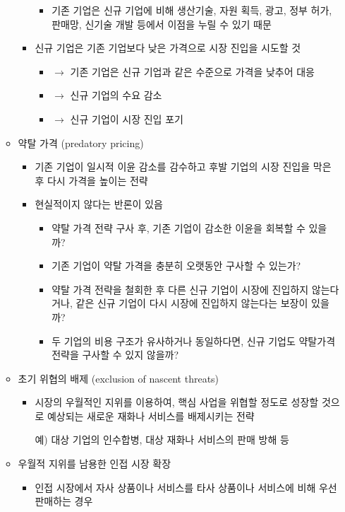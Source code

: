 \begin{itemize}
\begin{itemize}
\begin{itemize}
			\begin{itemize}
			\item 기존 기업은 신규 기업에 비해 생산기술, 자원 획득, 광고, 정부 허가, 판매망, 신기술 개발 등에서 이점을 누릴 수 있기 때문
			\end{itemize}
		\item 신규 기업은 기존 기업보다 낮은 가격으로 시장 진입을 시도할 것
			\begin{itemize}
			\item  $\rightarrow$ 기존 기업은 신규 기업과 같은 수준으로 가격을 낮추어 대응
			\item $\rightarrow$ 신규 기업의 수요 감소 
			\item $\rightarrow$ 신규 기업이 시장 진입 포기
			\end{itemize}
		\end{itemize}
	\item 약탈 가격 (predatory pricing)
		\begin{itemize}
		\item 기존 기업이 일시적 이윤 감소를 감수하고 후발 기업의 시장 진입을 막은 후 다시 가격을 높이는 전략
		\item 현실적이지 않다는 반론이 있음
			\begin{itemize}
			\item 약탈 가격 전략 구사 후, 기존 기업이 감소한 이윤을 회복할 수 있을까?
			\item 기존 기업이 약탈 가격을 충분히 오랫동안 구사할 수 있는가?
			\item 약탈 가격 전략을 철회한 후 다른 신규 기업이 시장에 진입하지 않는다거나, 같은 신규 기업이 다시 시장에 진입하지 않는다는 보장이 있을까?
			\item 두 기업의 비용 구조가 유사하거나 동일하다면, 신규 기업도 약탈가격 전략을 구사할 수 있지 않을까?
			\end{itemize}
		\end{itemize}
	\item 초기 위협의 배제 (exclusion of nascent threats)
		\begin{itemize}
		\item 시장의 우월적인 지위를 이용하여, 핵심 사업을 위협할 정도로 성장할 것으로 예상되는 새로운 재화나 서비스를 배제시키는 전략
		\item[예)] 대상 기업의 인수합병, 대상 재화나 서비스의 판매 방해 등 
		\end{itemize}	
	\item 우월적 지위를 남용한 인접 시장 확장	
		\begin{itemize}
		\item 인접 시장에서 자사 상품이나 서비스를 타사 상품이나 서비스에 비해 우선 판매하는 경우

\end{itemize}
\end{itemize}
\end{itemize}
